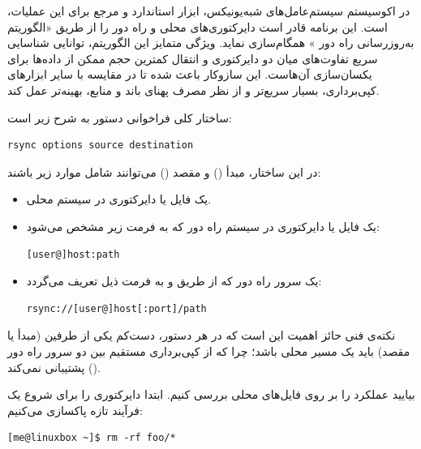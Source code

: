 در اکوسیستم سیستم‌عامل‌های شبه‌یونیکس، ابزار استاندارد و مرجع برای این عملیات،  است. این برنامه قادر است دایرکتوری‌های محلی و راه دور را از طریق «الگوریتم به‌روزرسانی راه دور » همگام‌سازی نماید. ویژگی متمایز این الگوریتم، توانایی شناسایی سریع تفاوت‌های میان دو دایرکتوری و انتقال کمترین حجم ممکن از داده‌ها برای یکسان‌سازی آن‌هاست. این سازوکار باعث شده تا  در مقایسه با سایر ابزارهای کپی‌برداری، بسیار سریع‌تر و از نظر مصرف پهنای باند و منابع، بهینه‌تر عمل کند.

ساختار کلی فراخوانی دستور  به شرح زیر است:

\begin{latin}
\begin{lstlisting}
rsync options source destination
\end{lstlisting}
\end{latin}

در این ساختار، مبدأ () و مقصد () می‌توانند شامل موارد زیر باشند:

\begin{itemize}
  \item یک فایل یا دایرکتوری در سیستم محلی.
  \item یک فایل یا دایرکتوری در سیستم راه دور که به فرمت زیر مشخص می‌شود:
\begin{latin}
\begin{lstlisting}
[user@]host:path
\end{lstlisting}
\end{latin}
  \item یک سرور راه دور  که از طریق  و به فرمت ذیل تعریف می‌گردد:
\begin{latin}
\begin{lstlisting}
rsync://[user@]host[:port]/path
\end{lstlisting}
\end{latin}
\end{itemize}

نکته‌ی فنی حائز اهمیت این است که در هر دستور، دست‌کم یکی از طرفین (مبدأ یا مقصد) باید یک مسیر محلی باشد؛ چرا که  از کپی‌برداری مستقیم بین دو سرور راه دور () پشتیبانی نمی‌کند.

بیایید عملکرد  را بر روی فایل‌های محلی بررسی کنیم. ابتدا دایرکتوری  را برای شروع یک فرآیند تازه پاکسازی می‌کنیم:

\begin{latin}
\begin{lstlisting}
[me@linuxbox ~]$ rm -rf foo/*
\end{lstlisting}
\end{latin}


